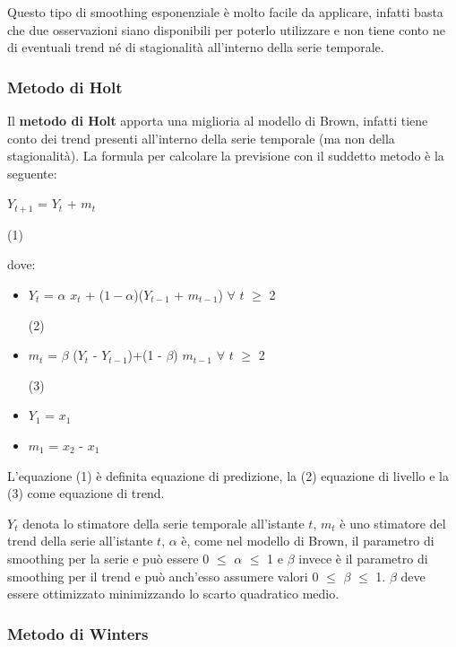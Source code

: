 \documentclass[12pt,a4paper,twoside,openright]{book}
\begin{document}
Questo tipo di smoothing esponenziale è molto facile da applicare, infatti basta che due osservazioni siano disponibili per poterlo utilizzare e non tiene conto ne di eventuali trend né di stagionalità all'interno della serie temporale.
\subsubsection{Metodo di Holt}
Il {\bfseries metodo di Holt} apporta una miglioria al modello di Brown, infatti tiene conto dei trend presenti all'interno della serie temporale (ma non della stagionalità). La formula per calcolare la previsione con il suddetto metodo è la seguente:

 \begin{center} 
$Y_{t+1}$ = $Y_{t}$ + $m_{t}$  
\end{center} 
\begin{flushright}
(1)
\end{flushright}

dove: 
\begin{itemize}

\item $Y_{t}$ = $\alpha$ $x_{t}$ + (${1 - \alpha }$)($Y_{t-1}$ + $m_{t-1}$) $\forall$ $t$ $\geq$ 2 
\begin{flushright}
(2)
\end{flushright}
\item $m_{t}$ = $\beta$ ($Y_{t}$ - $Y_{t-1}$)+(1 - $\beta$) $m_{t-1}$ $\forall$ $t$ $\geq$ 2 
\begin{flushright}
(3)
\end{flushright}
\item $Y_{1}$ = $x_{1}$

\item $m_{1}$ = $x_{2}$ - $x_{1}$
\end{itemize}


L'equazione (1) è definita equazione di predizione, la (2) equazione di livello e la (3) come equazione di trend. 

$Y_{t}$ denota lo stimatore della serie temporale all'istante $t$, $m_{t}$ è uno stimatore del trend della serie all'istante $t$, $\alpha$ è, come nel modello di Brown, il parametro di smoothing per la serie e può essere 0 $\leq$ $\alpha$ $\leq$ 1 e $\beta$ invece è il parametro di smoothing per il trend e può anch'esso assumere valori 0 $\leq$ $\beta$ $\leq$ 1. 
$\beta$ deve essere ottimizzato minimizzando lo scarto quadratico medio.

\subsubsection{Metodo di Winters}
\end{document}
